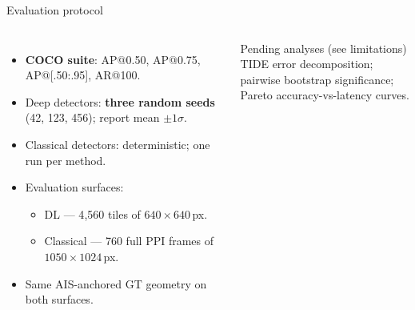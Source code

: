 \documentclass[aspectratio=169,10pt]{beamer}
\newcommand{\hl}[1]{\textcolor{garnet}{\textbf{#1}}}
\begin{document}
\begin{frame}{Evaluation protocol}
  \begin{columns}[T,onlytextwidth]
      \begin{itemize}\setlength\itemsep{0.45em}
        \item \hl{COCO suite}: AP@0.50, AP@0.75, AP@[.50:.95], AR@100.
        \item Deep detectors: \hl{three random seeds} (42, 123, 456); report mean $\pm 1\sigma$.
        \item Classical detectors: deterministic; one run per method.
        \item Evaluation surfaces:
          \begin{itemize}\setlength\itemsep{0.15em}
            \item DL --- 4{,}560 tiles of $640\times640$\,px.
            \item Classical --- 760 full PPI frames of $1050\times1024$\,px.
          \end{itemize}
        \item Same AIS-anchored GT geometry on both surfaces.
      \end{itemize}
      \begin{block}{Pending analyses (see limitations)}
        \small
        TIDE error decomposition;\\
        pairwise bootstrap significance;\\
        Pareto accuracy-vs-latency curves.
      \end{block}
  \end{columns}
\end{frame}
\end{document}
